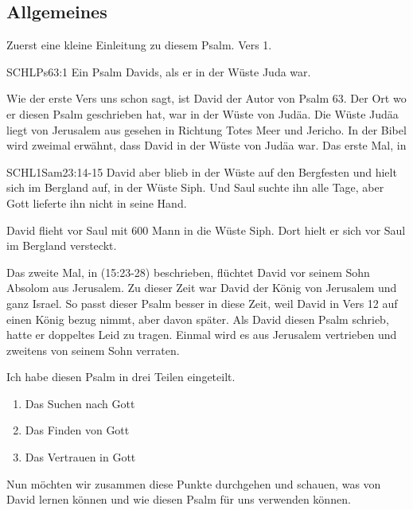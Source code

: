 \documentclass[14pt]{../../inc/mybib}
\begin{document}
    \subsection{Allgemeines}
    \begin{block}[Allgemeines]
    Zuerst eine kleine Einleitung zu diesem Psalm. Vers 1.
        \begin{bibelbox}{SCHL}{Ps}{63:1}
            Ein Psalm Davids, als er in der Wüste Juda war.
        \end{bibelbox}
    Wie der erste Vers uns schon sagt, ist David der Autor von Psalm 63. Der Ort wo er diesen Psalm geschrieben hat, war in der Wüste von Judäa. Die Wüste Judäa liegt von Jerusalem aus gesehen in Richtung Totes Meer und Jericho. In der Bibel wird zweimal erwähnt, dass David in der Wüste von Judäa war. Das erste Mal, in     
    \begin{bibelbox}{SCHL}{1Sam}{23:14-15}
        David aber blieb in der Wüste auf den Bergfesten und hielt sich im Bergland auf, in der Wüste Siph. Und Saul suchte ihn alle Tage, aber Gott lieferte ihn nicht in seine Hand.
    \end{bibelbox}    
    David flieht vor Saul mit 600 Mann in die Wüste Siph. Dort hielt er sich vor Saul im Bergland versteckt.
    
    Das zweite Mal, in (15:23-28) beschrieben, flüchtet David vor seinem Sohn Absolom aus Jerusalem. Zu dieser Zeit war David der König von Jerusalem und ganz Israel. So passt dieser Psalm besser in diese Zeit, weil David in Vers 12 auf einen König bezug nimmt, aber davon später. Als David diesen Psalm schrieb, hatte er doppeltes Leid zu tragen. Einmal wird es aus Jerusalem vertrieben und zweitens von seinem Sohn verraten.
    \end{block}
    \begin{block}
        Ich habe diesen Psalm in drei Teilen eingeteilt. 
        \begin{enumerate}
            \item Das Suchen nach Gott 
            \item Das Finden von Gott 
            \item Das Vertrauen in Gott 
        \end{enumerate}
        Nun möchten wir zusammen diese Punkte durchgehen und schauen, was  von David lernen können und wie  diesen Psalm für uns verwenden können.
    \end{block}
\end{document}
